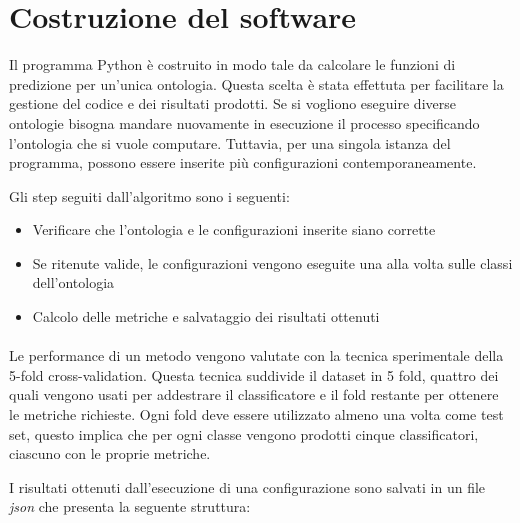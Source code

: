 \documentclass[12pt,a4paper,oneside,hidelinks]{report}
\begin{document}
\section{Costruzione del software}
Il programma Python è costruito in modo tale da calcolare le funzioni di predizione per un'unica ontologia. Questa scelta è stata effettuta per facilitare la gestione del codice e dei risultati prodotti. Se si vogliono eseguire diverse ontologie bisogna mandare nuovamente in esecuzione il processo specificando l'ontologia che si vuole computare.
Tuttavia, per una singola istanza del programma, possono essere inserite più configurazioni contemporaneamente.

Gli step seguiti dall'algoritmo sono i seguenti:

\begin{itemize}
    \item Verificare che l'ontologia e le configurazioni inserite siano corrette
    \item Se ritenute valide, le configurazioni vengono eseguite una alla volta sulle classi dell'ontologia
    \item Calcolo delle metriche e salvataggio dei risultati ottenuti
\end{itemize}

\paragraph*{}
Le performance di un metodo vengono valutate con la tecnica sperimentale della 5-fold cross-validation. Questa tecnica suddivide il dataset in 5 fold, quattro dei quali vengono usati per addestrare il classificatore e il fold restante per ottenere le metriche richieste. Ogni fold deve essere utilizzato almeno una volta come test set, questo implica che per ogni classe vengono prodotti cinque classificatori, ciascuno con le proprie metriche.

I risultati ottenuti dall'esecuzione di una configurazione sono salvati in un file \textit{json} che presenta la seguente struttura:
\end{document}
